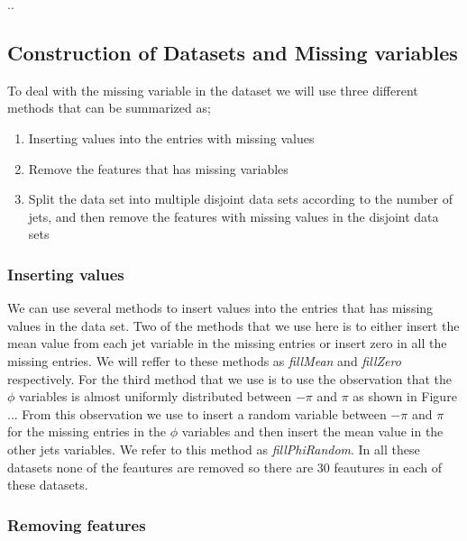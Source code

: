 \documentclass[../../main/main.tex]{subfiles}
\begin{document}
..
\subsection{Construction of Datasets and Missing variables}
\label{sec:missing-variables}

To deal with the missing variable in the dataset we will use three different methods that can be summarized as;
\begin{enumerate}[label=\Roman*.]
\item Inserting values into the entries with missing values
\item Remove the features that has missing variables
\item Split the data set into multiple disjoint data sets according to the number of jets, and then remove the features with missing values in the disjoint data sets
\end{enumerate}

\subsubsection*{Inserting values}
\label{sec:inserting-values}

We can use several methods to insert values into the entries that has missing values in the data set. Two of the methods that we use here is to either insert the mean value from each jet variable in the missing entries or insert zero in all the missing entries. We will reffer to these methods as \emph{fillMean} and \emph{fillZero} respectively. For the third method that we use is to use the observation that the \(\phi\) variables is almost uniformly distributed between \(-\pi\) and \(\pi\) as shown in Figure ... From this observation we use to insert a random variable between \(-\pi\) and \(\pi\) for the missing entries in the \(\phi\) variables and then insert the mean value in the other jets variables. We refer to this method as \emph{fillPhiRandom}. In all these datasets none of the feautures are removed so there are 30 feautures in each of these datasets.

\subsubsection*{Removing features}
\end{document}
